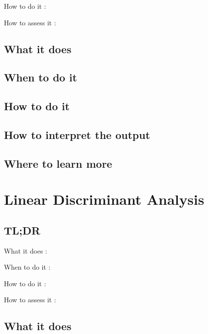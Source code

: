 \documentclass[
]{book}
\begin{document}
How to do it
:

How to assess it
:

\hypertarget{what-it-does-3}{%
\section{What it does}\label{what-it-does-3}}

\hypertarget{when-to-do-it-3}{%
\section{When to do it}\label{when-to-do-it-3}}

\hypertarget{how-to-do-it-3}{%
\section{How to do it}\label{how-to-do-it-3}}

\hypertarget{how-to-interpret-the-output-3}{%
\section{How to interpret the output}\label{how-to-interpret-the-output-3}}

\hypertarget{where-to-learn-more-3}{%
\section{Where to learn more}\label{where-to-learn-more-3}}

\hypertarget{linear-discriminant-analysis}{%
\chapter{Linear Discriminant Analysis}\label{linear-discriminant-analysis}}

\hypertarget{tldr-4}{%
\section{TL;DR}\label{tldr-4}}

What it does
:

When to do it
:

How to do it
:

How to assess it
:

\hypertarget{what-it-does-4}{%
\section{What it does}\label{what-it-does-4}}
\end{document}
